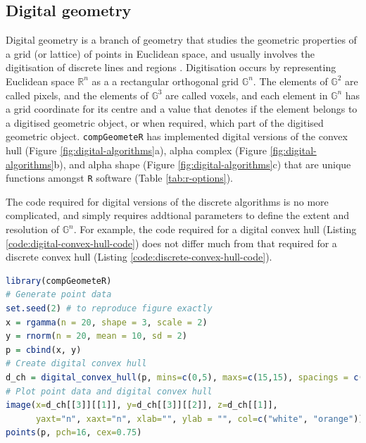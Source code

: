 \documentclass[12pt, a4paper]{article}
\begin{document}
\subsection{Digital geometry}

Digital geometry is a branch of geometry that studies the geometric properties of a grid (or lattice) of points in Euclidean space, and usually involves the digitisation of discrete lines and regions \citep{rosenfeld-1989}.  Digitisation occurs by representing Euclidean space $\mathbb{R}^n$ as a a rectangular orthogonal grid $\mathbb{G}^n$.  The elements of $\mathbb{G}^2$ are called pixels, and the elements of $\mathbb{G}^3$ are called voxels, and each element in $\mathbb{G}^n$ has a grid coordinate for its centre \citep{klette-2004} and a value that denotes if the element belongs to a digitised geometric object, or when required, which part of the digitised geometric object.  \texttt{compGeometeR} has implemented digital versions of the convex hull (Figure \ref{fig:digital-algorithms}a), alpha complex (Figure \ref{fig:digital-algorithms}b), and alpha shape (Figure \ref{fig:digital-algorithms}c) that are unique functions amongst \texttt{R} software (Table \ref{tab:r-options}).

The code required for digital versions of the discrete algorithms is no more complicated, and simply requires addtional parameters to define the extent and resolution of $\mathbb{G}^n$.  For example, the code required for a digital convex hull (Listing \ref{code:digital-convex-hull-code}) does not differ much from that required for a discrete convex hull (Listing \ref{code:discrete-convex-hull-code}).

\begin{lstlisting}[language=R, caption=Example \texttt{R} code to create a digital convex hull with \texttt{compGeometeR}, label={code:digital-convex-hull-code}]
library(compGeometeR)
# Generate point data
set.seed(2) # to reproduce figure exactly
x = rgamma(n = 20, shape = 3, scale = 2)
y = rnorm(n = 20, mean = 10, sd = 2)
p = cbind(x, y)
# Create digital convex hull
d_ch = digital_convex_hull(p, mins=c(0,5), maxs=c(15,15), spacings = c(0.05,0.05))
# Plot point data and digital convex hull
image(x=d_ch[[3]][[1]], y=d_ch[[3]][[2]], z=d_ch[[1]], 
      yaxt="n", xaxt="n", xlab="", ylab = "", col=c("white", "orange"))
points(p, pch=16, cex=0.75)
\end{lstlisting}
\end{document}
